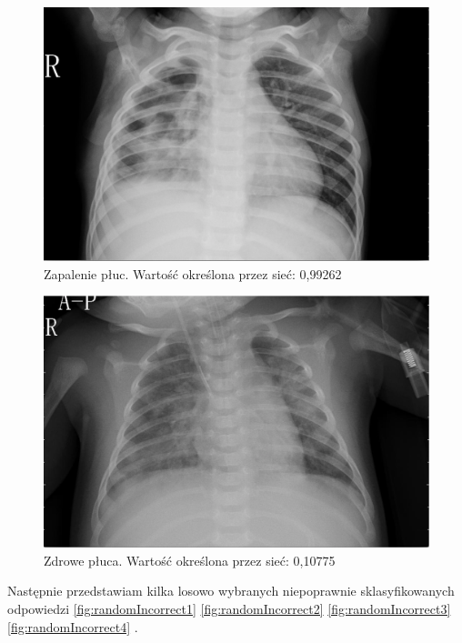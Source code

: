 \documentclass[12pt,a4paper,twoside,titlepage,openright]{book}
\begin{document}
\begin{figure}[ht]
	\centering
			\includegraphics[resolution=100, scale=0.3]{randomCorrect3.png}
		\caption{Zapalenie płuc. Wartość określona przez sieć: 0,99262}
				\label{fig:randomCorrect3}
\end{figure}

\begin{figure}[ht]
	\centering
			\includegraphics[resolution=100, scale=0.3]{randomCorrect4.png}
		\caption{Zdrowe płuca. Wartość określona przez sieć: 0,10775}
				\label{fig:randomCorrect4}
\end{figure}

Następnie przedstawiam kilka losowo wybranych niepoprawnie sklasyfikowanych odpowiedzi \ref{fig:randomIncorrect1} \ref{fig:randomIncorrect2} \ref{fig:randomIncorrect3} \ref{fig:randomIncorrect4} .
\end{document}
